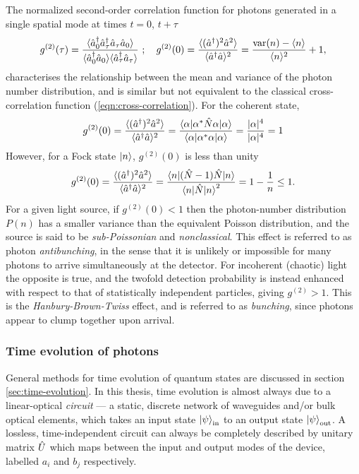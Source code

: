 The normalized second-order correlation function for photons generated in a single spatial mode at times $t=0$, $t+\tau$
\begin{equation}
g^{(2)}(\tau)=\frac
{
    \langle  \hat{a}^{\dagger}_0 \hat{a}^{\dagger}_\tau \hat{a}_\tau \hat{a}_0  \rangle
}{
    \langle  \hat{a}^{\dagger}_0 \hat{a}_0 \rangle \langle  \hat{a}^{\dagger}_\tau \hat{a}_\tau  \rangle
}~;\quad
g^{(2)}(0)=\frac {
    \langle  (\hat{a}^{\dagger})^2  \hat{a}^2 \rangle }{
    \langle  \hat{a}^{\dagger} \hat{a}  \rangle^2 } 
=
\frac {\textrm{var}(n) - \langle n \rangle} {\langle n \rangle^2} + 1
,
\end{equation}
characterises the relationship between the mean and variance of the photon number distribution, and 
is similar but not equivalent to the classical cross-correlation function (\ref{eqn:cross-correlation}). 
For the coherent state,
\begin{equation}
    g^{(2)}(0)=\frac { \langle  (\hat{a}^{\dagger})^2  \hat{a}^2 \rangle
    }{ \langle  \hat{a}^{\dagger} \hat{a}  \rangle^2 } 
    =
    \frac{\mbox{$ \langle \alpha | $} \alpha^* \hat{N} \alpha \mbox{$ | \alpha \rangle $}}
    {\mbox{$ \langle \alpha | $}\alpha^* \alpha\mbox{$ | \alpha \rangle $}} = \frac{|\alpha|^4}{|\alpha|^4} = 1
    \label{eqn:coherent-state-g2}
\end{equation}
However, for a Fock state $\mbox{$ | n \rangle $}$, $g^{(2)}(0)$ is less than unity
\begin{equation}
    g^{(2)}(0)=\frac { \langle  (\hat{a}^{\dagger})^2  \hat{a}^2 \rangle
    }{ \langle  \hat{a}^{\dagger} \hat{a}  \rangle^2 } 
    =
    \frac{\mbox{$ \langle n | $}(\hat{N}-1)\hat{N} \mbox{$ | n \rangle $}}
    {\mbox{$ \langle n | $}\hat{N}\mbox{$ | n \rangle $}^2}
    = 1-\frac{1}{n}  \le 1.
    \label{eqn:antibunching}
\end{equation}
For a given light source, if $g^{(2)}(0)<1$ then the photon-number distribution $P(n)$ has a smaller variance than the equivalent Poisson distribution, and the source is said to be \emph{sub-Poissonian} and \emph{nonclassical}. This effect is referred to as photon \emph{antibunching}, in the sense that it is unlikely or impossible for many photons to arrive simultaneously at the detector.  For incoherent (chaotic) light the opposite is true, and the twofold detection probability is instead enhanced with respect to that of statistically independent particles, giving $g^{(2)}>1$. This is the \emph{Hanbury-Brown-Twiss} \cite{Brown1956b} effect, and is referred to as \emph{bunching}, since photons appear to clump together upon arrival.

\subsubsection{Time evolution of photons}
General methods for time evolution of quantum states are discussed in section \ref{sec:time-evolution}.
In this thesis, time evolution is almost always due to a linear-optical \emph{circuit} --- a static, discrete network of waveguides and/or bulk optical elements, which takes an input state $\mbox{$ | \psi \rangle $}_{\mathrm{in}}$ to an output state $\mbox{$ | \psi \rangle $}_{\mathrm{out}}$.  A lossless, time-independent circuit can always be completely described by  unitary matrix $\hat{U}$ which maps between the input and output modes of the device, labelled $a_i$ and $b_j$ respectively. 


